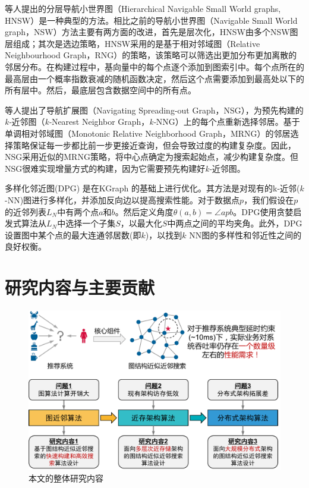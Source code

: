 \citet{hnsw-2018}等人提出的分层导航小世界图（Hierarchical Navigable Small World graphs, HNSW）是一种典型的\ganns 方法。相比之前的导航小世界图\cite{nsw-2014}（Navigable Small World graph，NSW）方法主要有两方面的改进，首先是层次化，HNSW由多个NSW图层组成；其次是选边策略，HNSW采用的是基于相对邻域图\cite{rng-1980}（Relative Neighbourhood Graph，RNG）的策略，该策略可以筛选出更加分布更加离散的邻居分布。在构建过程中，基向量中的每个点逐个添加到图索引中。每个点所在的最高层由一个概率指数衰减的随机函数决定，然后这个点需要添加到最高处以下的所有层中。然后，最底层包含数据空间中的所有点。

\citet{nsg-2019}等人提出了导航扩展图（Navigating Spreading-out Graph，NSG），为预先构建的\textit{k-}近邻图（\textit{k-}Nearest Neighbor Graph，\textit{k-}NNG）上的每个点重新选择邻居。基于单调相对邻域图（Monotonic Relative Neighborhood Graph，MRNG）\cite{nsg-2019}的邻居选择策略保证每一步都比前一步更接近查询，但会导致过度的构建复杂度。因此，NSG采用近似的MRNG策略，将中心点确定为搜索起始点，减少构建复杂度。但NSG很难实现增量方式的构建，因为它需要预先构建好\textit{k-}近邻图。

多样化邻近图(DPG) \cite{dpg-2019}是在KGraph \cite{kgraph-2011}的基础上进行优化。其方法是对现有的k-近邻($k$-NN)图进行多样化，并添加反向边以提高搜索性能。对于数据点$p$，我们假设在$p$的近邻列表${L_N}$中有两个点$a$和$b$。然后定义角度$\theta (a,b) = \angle apb$。DPG使用贪婪启发式算法从${L_N}$中选择一个子集$S$，以最大化$S$中两点之间的平均夹角。此外，DPG设置图中某个点的最大连通邻居数(即$k$)，以找到$k$ NN图的多样性和邻近性之间的良好权衡。



\section{研究内容与主要贡献}

\begin{figure}
  \centering
  \includegraphics[width=0.7\linewidth]{figures/Introduction/overview.pdf}
  \caption{本文的整体研究内容}
  \label{fig:overview}
\end{figure}

